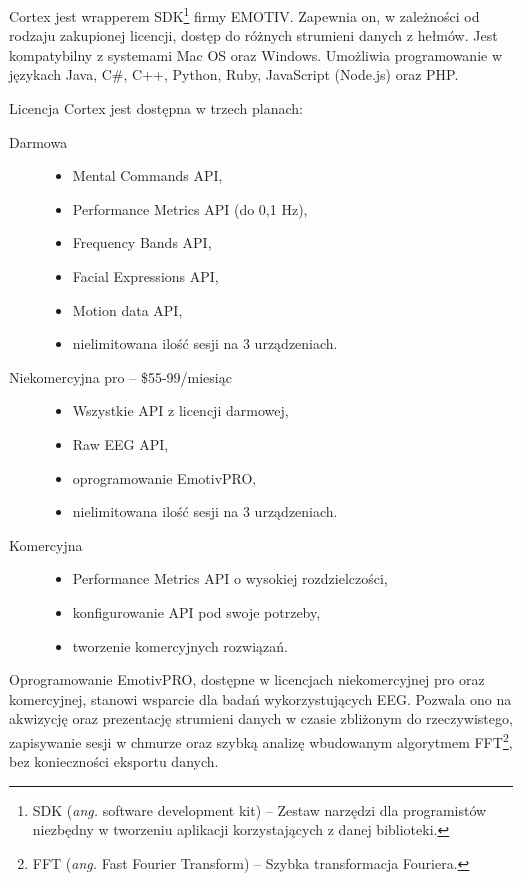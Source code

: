 \documentclass[skorowidz,skroty]{dyplomWEZUT}
\begin{document}
Cortex jest wrapperem SDK\footnote{SDK (\textit{ang.} software development kit) -- Zestaw narzędzi dla programistów niezbędny w tworzeniu aplikacji korzystających z danej biblioteki.} firmy EMOTIV. Zapewnia on, w zależności od rodzaju zakupionej licencji, dostęp do różnych strumieni danych z hełmów. Jest kompatybilny z systemami Mac OS oraz Windows. Umożliwia programowanie w językach Java, C\#, C++, Python, Ruby, JavaScript (Node.js) oraz PHP.

Licencja Cortex jest dostępna w trzech planach:
\begin{description}
    \item [Darmowa] \hfill
    \begin{itemize}
        \item Mental Commands API,
        \item Performance Metrics API (do 0,1 Hz),
        \item Frequency Bands API,
        \item Facial Expressions API,
        \item Motion data API,
        \item nielimitowana ilość sesji na 3 urządzeniach.
    \end{itemize}
    \item [Niekomercyjna pro -- \$55-99/miesiąc] \hfill
    \begin{itemize}
        \item Wszystkie API z licencji darmowej,
        \item Raw EEG API,
        \item oprogramowanie EmotivPRO,
        \item nielimitowana ilość sesji na 3 urządzeniach.
    \end{itemize}
    \item [Komercyjna] \hfill
    \begin{itemize}
        \item Performance Metrics API o wysokiej rozdzielczości,
        \item konfigurowanie API pod swoje potrzeby,
        \item tworzenie komercyjnych rozwiązań.
    \end{itemize}
\end{description}

Oprogramowanie EmotivPRO\cite{emotiv_pro}, dostępne w licencjach niekomercyjnej pro oraz komercyjnej, stanowi wsparcie dla badań wykorzystujących EEG. Pozwala ono na akwizycję oraz prezentację strumieni danych w czasie zbliżonym do rzeczywistego, zapisywanie sesji w chmurze oraz szybką analizę wbudowanym algorytmem FFT\footnote{FFT (\textit{ang.} Fast Fourier Transform) -- Szybka transformacja Fouriera.}, bez konieczności eksportu danych.
\end{document}
